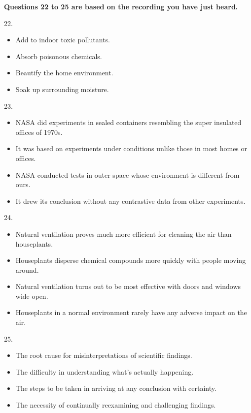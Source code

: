 \documentclass[UTF8,11pt]{ctexart}
\begin{document}
\textbf{Questions 22 to 25 are based on the recording you have just heard.}


22.


\begin{itemize}[leftmargin=2em,itemsep=.2em,topsep=.4em]\item[A.] Add to indoor toxic pollutants.
\item[B.] Absorb poisonous chemicals.
\item[C.] Beautify the home environment.
\item[D.] Soak up surrounding moisture.
\end{itemize}

23.


\begin{itemize}[leftmargin=2em,itemsep=.2em,topsep=.4em]\item[A.] NASA did experiments in sealed containers resembling the super insulated offices of 1970s.
\item[B.] It was based on experiments under conditions unlike those in most homes or offices.
\item[C.] NASA conducted tests in outer space whose environment is different from ours.
\item[D.] It drew its conclusion without any contrastive data from other experiments.
\end{itemize}

24.


\begin{itemize}[leftmargin=2em,itemsep=.2em,topsep=.4em]\item[A.] Natural ventilation proves much more efficient for cleaning the air than houseplants.
\item[B.] Houseplants disperse chemical compounds more quickly with people moving around.
\item[C.] Natural ventilation turns out to be most effective with doors and windows wide open.
\item[D.] Houseplants in a normal environment rarely have any adverse impact on the air.
\end{itemize}

25.


\begin{itemize}[leftmargin=2em,itemsep=.2em,topsep=.4em]\item[A.] The root cause for misinterpretations of scientific findings.
\item[B.] The difficulty in understanding what’s actually happening.
\item[C.] The steps to be taken in arriving at any conclusion with certainty.
\item[D.] The necessity of continually reexamining and challenging findings.
\end{itemize}
\end{document}
